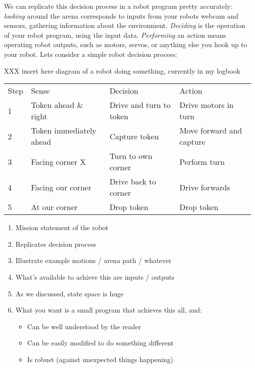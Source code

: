 \documentclass[a4paper,10pt]{article}
\begin{document}
We can replicate this decision process in a robot program pretty accurately:
\textit{looking} around the arena corresponds to inputs from your robots webcam
and sensors, gathering information about the environment. \textit{Deciding} is
the operation of your robot program, using the input data. \textit{Performing}
an action means operating robot outputs, such as motors, servos, or anything
else you hook up to your robot. Lets consider a simple robot decision process:

XXX insert here diagram of a robot doing something, currently in my logbook

\begin{table*}[ht]
\begin{tabular}{|l|l|l|l|}
\hline
Step & Sense & Decision & Action \\
\hhline{|=|=|=|=|}
1 & Token ahead \& right & Drive and turn to token & Drive motors in turn \\
\hline
2 & Token immediately ahead & Capture token & Move forward and capture \\
\hline
3 & Facing corner X & Turn to own corner & Perform turn \\
\hline
4 & Facing our corner & Drive back to corner & Drive forwards \\
\hline
5 & At our corner & Drop token & Drop token \\
\hline
\end{tabular}
\end{table*}

\begin{enumerate}
\item Mission statement of the robot
\item Replicates decision process
\item Illustrate example motions / arena path / whatever
\item What's available to achieve this are inputs / outputs
\item As we discussed, state space is huge
\item What you want is a small program that achieves this all, and:
\begin{itemize}
	\item Can be well understood by the reader
	\item Can be easily modified to do something different
	\item Is robust (against unexpected things happening)
\end{itemize}
\end{enumerate}
\end{document}
